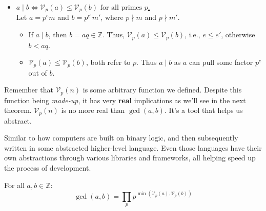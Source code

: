 \begin{Proof}
\begin{itemize}
        \item \underline{$a \mid b \iff \mathcal{V}_p(a) \leq \mathcal{V}_p(b) \text{ for all primes } p$.}\\
        Let $a = p^e m$ and $b = p^{e'} m'$, where $p \nmid m$ and $p \nmid m'$. 
        \vspace{-.5em}
        \begin{itemize}
            \item If $a \mid b$, then $b = aq\in\mathbb{Z}$. Thus, $\mathcal{V}_p(a) \leq \mathcal{V}_p(b)$, i.e., $e\leq e'$, otherwise $b<aq$.
            \item $\mathcal{V}_p(a) \leq \mathcal{V}_p(b)$, both refer to $p$. Thus $a\mid b$ as $a$ can pull some factor $p^e$ out of $b$.
        \end{itemize}
    \end{itemize}
\end{Proof}

\begin{Tip}
    Remember that $\mathcal{V}_p(n)$ is some arbitrary function we defined.
    Despite this function being \textit{made-up}, it has very \textbf{real} implications as we'll see in the next theorem. 
    $\mathcal{V}_p(n)$ is no more real than $\gcd(a,b)$. It's a tool that helps us abstract.


    Similar to how computers are built on binary logic, and then subsequently written in some
    abstracted higher-level language. Even those languages have their own abstractions through various libraries and frameworks,
    all helping speed up the process of development.

\end{Tip}

\newpage

\begin{theo}

    \label{theo:GCD_abstracted}

    For all $a,b\in\mathbb{Z}$:
    \[\gcd(a,b) = \prod_{p} p^{\min(\mathcal{V}_p(a),\mathcal{V}_p(b))}\]

\end{theo}


